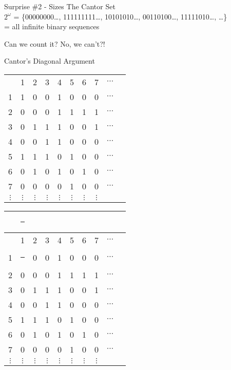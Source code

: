 \documentclass[compress,17pt]{beamer}
\newcommand\hl{\bgroup\markoverwith
    {\textcolor{yellow}{\rule[-.5ex]{.1pt}{2.5ex}}}\ULon}
\begin{document}
\begin{frame}{Surprise \#2 - Sizes}
  The Cantor Set \\
  $2^\omega$ = \{00000000\dots, 111111111\dots, 10101010\dots, 00110100\dots, 11111010\dots, \dots\}\\
  = {all infinite binary sequences} \\ \pause
  \vphantom{text}

  Can we count it? \pause No, we can't?!
\end{frame}

\begin{frame}[standout]
  \large
  Cantor's Diagonal Argument
\end{frame}

\begin{frame}
  \begin{tabular}{ | c | c c c c c c c c c }
    \hline
    &  \\
    \hline
      & 1 & 2 & 3 & 4 & 5 & 6 & 7 & $\cdots$\\
      \hline
    1 & 1 & 0 & 0 & 1 & 0 & 0 & 0 & $\cdots$\\
    2 & 0 & 0 & 0 & 1 & 1 & 1 & 1 & $\cdots$\\
    3 & 0 & 1 & 1 & 1 & 0 & 0 & 1 & $\cdots$\\
    4 & 0 & 0 & 1 & 1 & 0 & 0 & 0 & $\cdots$\\
    5 & 1 & 1 & 1 & 0 & 1 & 0 & 0 & $\cdots$\\
    6 & 0 & 1 & 0 & 1 & 0 & 1 & 0 & $\cdots$\\
    7 & 0 & 0 & 0 & 0 & 1 & 0 & 0 & $\cdots$\\
    $\vdots$ & $\vdots$ & $\vdots$ & $\vdots$ & $\vdots$ & $\vdots$ & $\vdots$ & $\vdots$ & \\
  \end{tabular}
\end{frame}

\begin{frame}
  \begin{tabular}{ | c | c c c c c c c c c }
    \hline
    &  \hl 0 \\
    \hline
      & 1 & 2 & 3 & 4 & 5 & 6 & 7 & $\cdots$\\
      \hline
    1 & \hl 1 & 0 & 0 & 1 & 0 & 0 & 0 & $\cdots$\\
    2 & 0 & 0 & 0 & 1 & 1 & 1 & 1 & $\cdots$\\
    3 & 0 & 1 & 1 & 1 & 0 & 0 & 1 & $\cdots$\\
    4 & 0 & 0 & 1 & 1 & 0 & 0 & 0 & $\cdots$\\
    5 & 1 & 1 & 1 & 0 & 1 & 0 & 0 & $\cdots$\\
    6 & 0 & 1 & 0 & 1 & 0 & 1 & 0 & $\cdots$\\
    7 & 0 & 0 & 0 & 0 & 1 & 0 & 0 & $\cdots$\\
    $\vdots$ & $\vdots$ & $\vdots$ & $\vdots$ & $\vdots$ & $\vdots$ & $\vdots$ & $\vdots$ & \\
  \end{tabular}
\end{frame}
\end{document}
